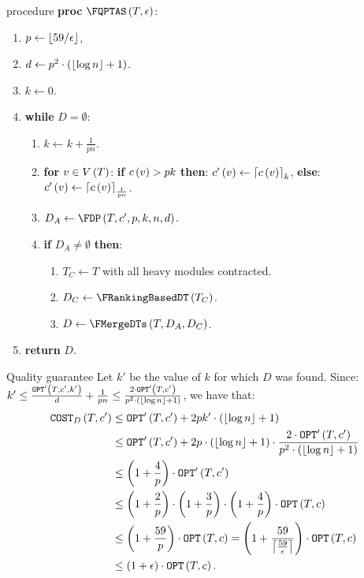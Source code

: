 \begin{frame}{\FQPTAS procedure}
\textbf{proc} $\FQPTAS\br{T, \epsilon}$:
\begin{enumerate}
    \item $p\gets \left\lfloor 59/\epsilon \right\rfloor$, 
    \item $d\gets p^2\cdot\left( \left\lfloor \log n \right\rfloor+1 \right)$.
    \item $k\gets 0$.
    \item \textbf{while} $D =\emptyset$:
    \begin{enumerate}
        \item $k\gets k +\frac{1}{pn}$.
        \item \textbf{for} $v\in V\left( T \right)$: \textbf{if} $c\left( v \right)>pk$ \textbf{then}: $c'\left( v \right)\gets\left\lceil c\left( v \right) \right\rceil_k$, \textbf{else}:  $c'\left( v \right)\gets\left\lceil c\left( v \right) \right\rceil_{\frac{1}{pn}}$.
        \item $D_A\gets \FDP\br{T,c',p,k,n,d}$.
        \item \textbf{if} $D_A\neq\emptyset$ \textbf{then}:
        \begin{enumerate}
            \item $T_C\gets T$ with all heavy modules contracted.
        \item $D_C\gets \FRankingBasedDT\br{T_C}$.
        \item $D\gets \FMergeDTs\br{T, D_A, D_C}$.
        \end{enumerate}
    \end{enumerate}
    \item \textbf{return} $D$.
\end{enumerate}
\end{frame}
\begin{frame}{Quality guarantee}
Let $k'$ be the value of $k$ for which $D$ was found. Since: $k'\leq \frac{\texttt{OPT}'\left( T,c',k' \right)}{d}+\frac{1}{pn}\leq\frac{2\cdot \texttt{OPT}'\left( T,c' \right)}{p^2\cdot\left( \left\lfloor \log n \right\rfloor+1 \right)}$, we have that:
\pause
\begin{align*}
    \texttt{COST}_{D}\left( T,c' \right)&\leq \texttt{OPT}'\left( T,c' \right)+2pk'\cdot \left( \left\lfloor \log n \right\rfloor+1 \right)
    \\&\leq 
    \texttt{OPT}'\left( T,c' \right)+2p\cdot \left( \left\lfloor \log n \right\rfloor+1 \right)\cdot \frac{2\cdot \texttt{OPT}'\left( T,c' \right)}{p^2\cdot\left( \left\lfloor \log n \right\rfloor+1 \right)} \\
    & \leq \left( 1+\frac{4}{p} \right)\cdot\texttt{OPT}'\left( T,c' \right) 
    \\&\leq 
    \left( 1+\frac{2}{p} \right)\cdot\left( 1+\frac{3}{p} \right)\cdot\left( 1+\frac{4}{p} \right)\cdot\texttt{OPT}\left( T,c \right)
    \\&
    \leq \left( 1+\frac{59}{p} \right)\cdot\texttt{OPT}\left( T,c \right) 
    = 
    \left( 1+\frac{59}{\left\lceil \frac{59}{\epsilon} \right\rceil} \right)\cdot\texttt{OPT}\left( T,c \right)
    \\&\leq 
    \left( 1+\epsilon \right)\cdot \texttt{OPT}\left( T,c \right).
\end{align*}
\end{frame}

